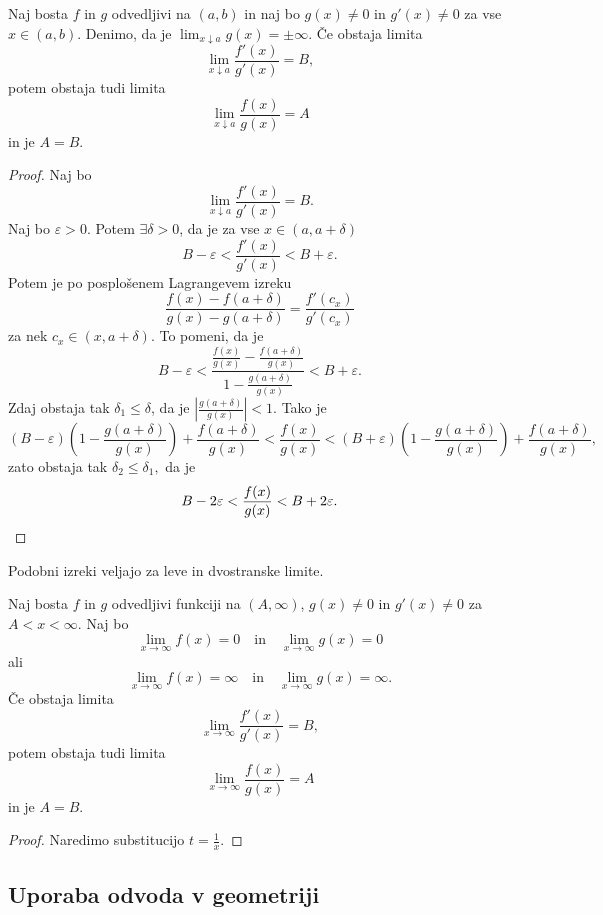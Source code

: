 \documentclass[12pt, a4paper]{article}
\begin{document}
\begin{izrek}
Naj bosta $f$ in $g$ odvedljivi na $(a,b)$ in naj bo $g(x)\ne 0$ in $g'(x)\ne 0$ za vse $x\in(a,b)$. Denimo, da je $\displaystyle\lim_{x\downarrow a}g(x)=\pm\infty$. Če obstaja limita
\[
\lim_{x\downarrow a}\frac{f'(x)}{g'(x)}=B,
\]
potem obstaja tudi limita
\[
\lim_{x\downarrow a}\frac{f(x)}{g(x)}=A
\]
in je $A=B$.
\end{izrek}

\begin{proof}
Naj bo
\[
\lim_{x\downarrow a}\frac{f'(x)}{g'(x)}=B.
\]
Naj bo $\varepsilon>0$. Potem $\exists\delta>0$, da je za vse $x\in(a,a+\delta)$
\[
B-\varepsilon<\frac{f'(x)}{g'(x)}<B+\varepsilon.
\]
Potem je po posplošenem Lagrangevem izreku
\[
\frac{f(x)-f(a+\delta)}{g(x)-g(a+\delta)}=\frac{f'(c_x)}{g'(c_x)}
\]
za nek $c_x\in(x,a+\delta)$. To pomeni, da je
\[
B-\varepsilon<\frac{\frac{f(x)}{g(x)}-\frac{f(a+\delta)}{g(x)}}{1-\frac{g(a+\delta)}{g(x)}}<B+\varepsilon.
\]
Zdaj obstaja tak $\delta_1\leq\delta$, da je $\left|\frac{g(a+\delta)}{g(x)}\right|<1$. Tako je
\[
(B-\varepsilon)\left(1-\frac{g(a+\delta)}{g(x)}\right)+\frac{f(a+\delta)}{g(x)}<\frac{f(x)}{g(x)}<(B+\varepsilon)\left(1-\frac{g(a+\delta)}{g(x)}\right)+\frac{f(a+\delta)}{g(x)},
\]
zato obstaja tak $\delta_2\leq\delta_1,$ da je
\[
B-2\varepsilon<\frac{f(x)}{g(x)}<B+2\varepsilon.\qedhere
\]
\end{proof}

\begin{opomba}
Podobni izreki veljajo za leve in dvostranske limite.
\end{opomba}

\begin{trditev}
Naj bosta $f$ in $g$ odvedljivi funkciji na $(A,\infty)$, $g(x)\ne 0$ in $g'(x)\ne 0$  za $A<x<\infty$. Naj bo
\[
\lim_{x\to\infty}f(x)=0\quad\text{in}\quad\lim_{x\to\infty}g(x)=0
\]
ali
\[
\lim_{x\to\infty}f(x)=\infty\quad\text{in}\quad\lim_{x\to\infty}g(x)=\infty.
\]
Če obstaja limita
\[
\lim_{x\to\infty}\frac{f'(x)}{g'(x)}=B,
\]
potem obstaja tudi limita
\[
\lim_{x\to\infty}\frac{f(x)}{g(x)}=A
\]
in je $A=B$.
\end{trditev}

\begin{proof}
Naredimo substitucijo $t=\frac{1}{x}$.
\end{proof}

\newpage

\subsection{Uporaba odvoda v geometriji}
\end{document}
